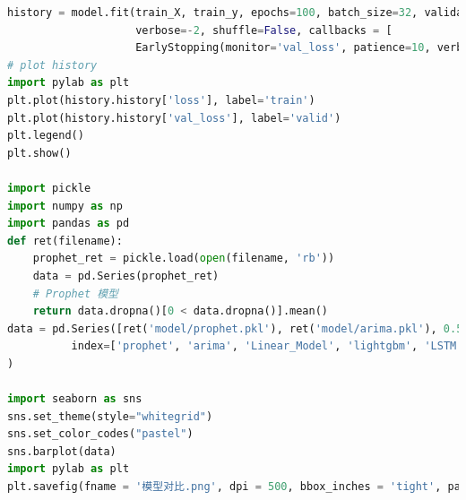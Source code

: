 \documentclass[withoutpreface,bwprint]{cumcmthesis}
\begin{document}
\begin{lstlisting}[language=python]
history = model.fit(train_X, train_y, epochs=100, batch_size=32, validation_data=(valid_X, valid_y),
                    verbose=-2, shuffle=False, callbacks = [
                    EarlyStopping(monitor='val_loss', patience=10, verbose=1)])
# plot history
import pylab as plt
plt.plot(history.history['loss'], label='train')
plt.plot(history.history['val_loss'], label='valid')
plt.legend()
plt.show()

import pickle
import numpy as np
import pandas as pd
def ret(filename):
    prophet_ret = pickle.load(open(filename, 'rb'))
    data = pd.Series(prophet_ret)
    # Prophet 模型
    return data.dropna()[0 < data.dropna()].mean()
data = pd.Series([ret('model/prophet.pkl'), ret('model/arima.pkl'), 0.5203795998318921, 0.540464244004423, 0.540434],
          index=['prophet', 'arima', 'Linear_Model', 'lightgbm', 'LSTM', ], name='1-wmape'
)

import seaborn as sns
sns.set_theme(style="whitegrid")
sns.set_color_codes("pastel")
sns.barplot(data)
import pylab as plt
plt.savefig(fname = '模型对比.png', dpi = 500, bbox_inches = 'tight', pad_inches = 0.0)
\end{lstlisting}
\end{document}
